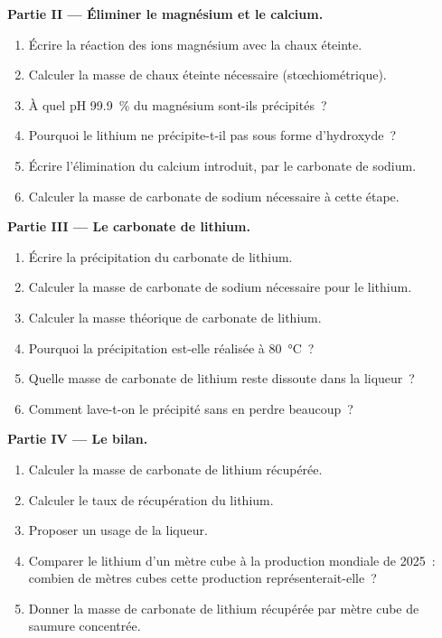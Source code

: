 \begin{problem}
\medskip
\noindent\textbf{Partie II --- Éliminer le magnésium et le calcium.}
\begin{enumerate}[resume]
  \item Écrire la réaction des ions magnésium avec la chaux éteinte.
  \item Calculer la masse de chaux éteinte nécessaire
        (stœchiométrique).
  \item À quel pH \qty{99.9}{\percent} du magnésium sont-ils
        précipités~?
  \item Pourquoi le lithium ne précipite-t-il pas sous forme
        d'hydroxyde~?
  \item Écrire l'élimination du calcium introduit, par le carbonate de
        sodium.
  \item Calculer la masse de carbonate de sodium nécessaire à cette
        étape.
\end{enumerate}

\medskip
\noindent\textbf{Partie III --- Le carbonate de lithium.}
\begin{enumerate}[resume]
  \item Écrire la précipitation du carbonate de lithium.
  \item Calculer la masse de carbonate de sodium nécessaire pour le
        lithium.
  \item Calculer la masse théorique de carbonate de lithium.
  \item Pourquoi la précipitation est-elle réalisée à
        \qty{80}{\celsius}~?
  \item Quelle masse de carbonate de lithium reste dissoute dans la
        liqueur~?
  \item Comment lave-t-on le précipité sans en perdre beaucoup~?
\end{enumerate}

\medskip
\noindent\textbf{Partie IV --- Le bilan.}
\begin{enumerate}[resume]
  \item Calculer la masse de carbonate de lithium récupérée.
  \item Calculer le taux de récupération du lithium.
  \item Proposer un usage de la liqueur.
  \item Comparer le lithium d'un mètre cube à la production mondiale de
        2025~: combien de mètres cubes cette production
        représenterait-elle~?
  \item Donner la masse de carbonate de lithium récupérée par mètre cube
        de saumure concentrée.
\end{enumerate}
\end{problem}
